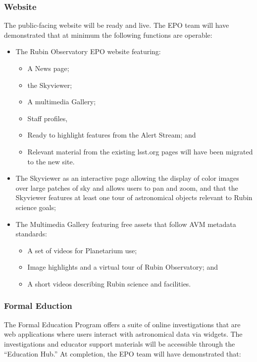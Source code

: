 \subsubsection{Website}

The public-facing website will be ready and live.  The EPO team will have demonstrated that at minimum the following functions are operable:

\begin{itemize}
	\item The Rubin Observatory EPO website featuring:
	\begin{itemize}
		\item A News page;
		\item the Skyviewer;
		\item A multimedia Gallery;
		\item Staff profiles,
		\item Ready to highlight features from the Alert Stream; and
		\item Relevant material from the existing lsst.org pages will have been migrated to the new site.
	\end{itemize}
	\item The Skyviewer as an interactive page allowing the display of color images over  large patches of sky and allows users to pan and zoom, and that the Skyviewer features at least one tour of astronomical objects relevant to Rubin science goals;
	\item The Multimedia Gallery featuring free assets that follow AVM metadata standards:
	\begin{itemize}
		\item A set of videos for Planetarium use;
		\item Image highlights and a virtual tour of Rubin Observatory; and
		\item A short videos describing Rubin science and facilities.
	\end{itemize}
\end{itemize}

\subsubsection{Formal Eduction}

The Formal Education Program offers a suite of online investigations that are web applications where users interact with astronomical data via widgets. The investigations and educator support materials will be accessible through the “Education Hub.”   At completion, the EPO team will have demonstrated that:

